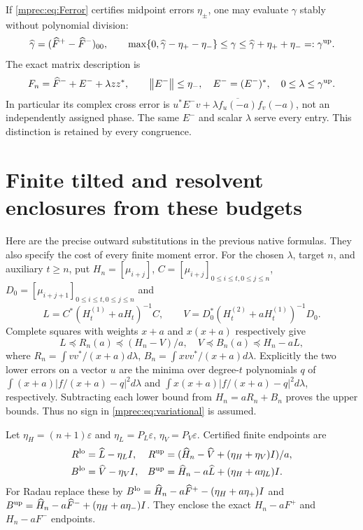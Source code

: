 If \eqref{mprec:eq:Ferror} certifies midpoint errors $\eta_\pm$,
one may evaluate $\gamma$ stably without polynomial division:
\begin{equation}\label{mprec:eq:gammaout}
 \widehat\gamma=(\widehat F^+-\widehat F^-)_{00},\qquad
 \max\{0,\widehat\gamma-\eta_+-\eta_-\}\le\gamma
 \le\widehat\gamma+\eta_++\eta_-=: \gamma^{\rm up}.
\end{equation}
The exact matrix description is
\begin{equation}\label{mprec:eq:phaseout}
 F_n=\widehat F^-+E^-+\lambda zz^*,\qquad
 \left\lVert E^-\right\rVert\le\eta_-,\quad E^-=(E^-)^*,\quad
 0\le\lambda\le\gamma^{\rm up}.
\end{equation}
In particular its complex cross error is
$u^*E^-v+\lambda\overline{f_u(-a)}f_v(-a)$, not an
independently assigned phase. The same $E^-$ and scalar $\lambda$
serve every entry. This distinction is retained by every congruence.

\section{Finite tilted and resolvent enclosures from these budgets}

Here are the precise outward substitutions in the previous native
formulas. They also specify the cost of every finite moment error.
For the chosen $\lambda$, target $n$, and auxiliary $t\ge n$,
put $H_n=[\mu_{i+j}]$, $C=[\mu_{i+j}]_{0\le i\le t,0\le j\le n}$,
$D_0=[\mu_{i+j+1}]_{0\le i\le t,0\le j\le n}$ and
\[
 L=C^*(H_t^{(1)}+aH_t)^{-1}C,\qquad
 V=D_0^*(H_t^{(2)}+aH_t^{(1)})^{-1}D_0.
\]
Complete squares with weights $x+a$ and $x(x+a)$ respectively
give
\begin{equation}\label{mprec:eq:variational}
 L\preceq R_n(a)\preceq(H_n-V)/a,\quad
 V\preceq B_n(a)\preceq H_n-aL,
\end{equation}
where $R_n=\int vv^*/(x+a)d\lambda$,
$B_n=\int xvv^*/(x+a)d\lambda$. Explicitly the two lower
errors on a vector $u$ are the minima over degree-$t$ polynomials
$q$ of $\int(x+a)|f/(x+a)-q|^2d\lambda$ and
$\int x(x+a)|f/(x+a)-q|^2d\lambda$, respectively.
Subtracting each lower bound from $H_n=aR_n+B_n$ proves the
upper bounds. Thus no sign in \eqref{mprec:eq:variational} is assumed.

Let $\eta_H=(n+1)\varepsilon$ and $\eta_L=P_L\varepsilon$,
$\eta_V=P_V\varepsilon$. Certified finite endpoints are
\begin{equation}\label{mprec:eq:outvar}
 \begin{aligned}
 R^{\rm lo}&=\widehat L-\eta_LI,&
 R^{\rm up}&=(\widehat H_n-\widehat V+(\eta_H+\eta_V)I)/a,\\
 B^{\rm lo}&=\widehat V-\eta_VI,&
 B^{\rm up}&=\widehat H_n-a\widehat L+(\eta_H+a\eta_L)I.
 \end{aligned}
\end{equation}
For Radau replace these by
$B^{\rm lo}=\widehat H_n-a\widehat F^+-(\eta_H+a\eta_+)I$
and
$B^{\rm up}=\widehat H_n-a\widehat F^-+(\eta_H+a\eta_-)I$.
They enclose the exact $H_n-aF^+$ and $H_n-aF^-$ endpoints.

